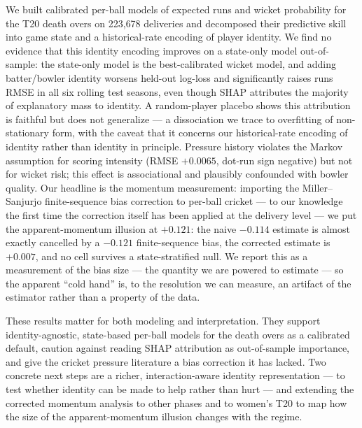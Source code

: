 We built calibrated per-ball models of expected runs and wicket probability for
the T20 death overs on 223{,}678 deliveries and decomposed their predictive skill
into game state and a historical-rate encoding of player identity. We find no
evidence that this identity encoding improves on a state-only model out-of-sample:
the state-only model is the best-calibrated wicket
model, and adding batter/bowler identity worsens held-out log-loss and significantly
raises runs RMSE in all six rolling test seasons, even though SHAP attributes the
majority of explanatory mass to identity. A random-player placebo shows this
attribution is faithful but does not generalize --- a dissociation we trace to
overfitting of non-stationary form, with the caveat that it concerns our
historical-rate encoding of identity rather than identity in principle. Pressure
history violates the Markov assumption for scoring intensity (RMSE $+0.0065$,
dot-run sign negative) but not for wicket risk; this effect is associational and
plausibly confounded with bowler quality. Our headline is the momentum
measurement: importing the Miller--Sanjurjo finite-sequence bias correction to
per-ball cricket --- to our knowledge the first time the correction itself has been
applied at the delivery level --- we put the apparent-momentum illusion at
$+0.121$: the naive $-0.114$ estimate is almost exactly cancelled by a $-0.121$
finite-sequence bias, the corrected estimate is $+0.007$, and no cell survives a
state-stratified null. We report this as a measurement of the bias size --- the
quantity we are powered to estimate --- so the apparent ``cold hand'' is, to the
resolution we can measure, an artifact of the estimator rather than a property of
the data.

These results matter for both modeling and interpretation. They support
identity-agnostic, state-based per-ball models for the death overs as a calibrated
default, caution against reading SHAP attribution as out-of-sample importance, and
give the cricket pressure literature a bias correction it has lacked. Two concrete
next steps are a richer, interaction-aware identity representation --- to test
whether identity can be made to help rather than hurt --- and extending the
corrected momentum analysis to other phases and to women's T20 to map how the size
of the apparent-momentum illusion changes with the regime.

